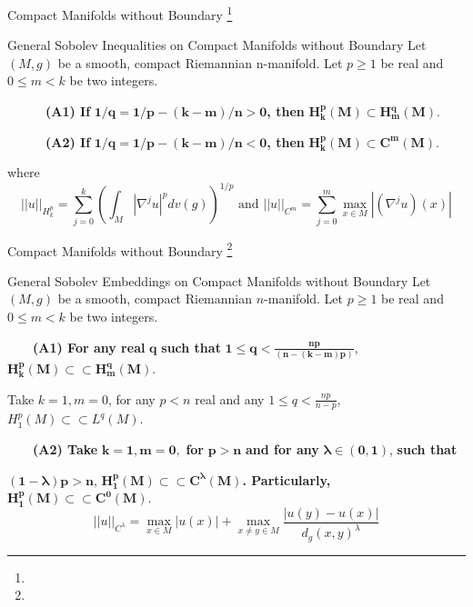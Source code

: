 \documentclass[xcolor=table,dvipsnames,svgnames,aspectratio=169,fontset=fandol]{ctexbeamer}
\begin{document}
\begin{frame}{Compact Manifolds without Boundary \footnote{} }
  \begin{alertblock}{General Sobolev Inequalities on Compact Manifolds without Boundary}
    Let $(M, g)$ be a smooth, compact Riemannian n-manifold.
    Let $p\geq 1$ be real and $0 \leq m<k$ be two integers.
    
    \vskip 5pt
    ~~~~~~\textbf{(A1) If} $\bm{1/q=1 / p-(k-m) / n > 0}$\textbf{, then} $\bm{H_k^p(M) \subset H_m^q(M)}$.
    
    \vskip 5pt
    ~~~~~~\textbf{(A2) If} $\bm{1/q=1 / p-(k-m) / n < 0}$\textbf{, then} $\bm{H_k^p(M) \subset C^m(M)}$.
    
    \vskip 5pt
    where
    $$
    ||u||_{H_k^p}=\sum_{j=0}^k\left(\int_M\left|\nabla^j u\right|^p d v(g)\right)^{1 / p}\,\,\text{and}\,\, ||u||_{C^m}=\sum_{j=0}^m \max _{x \in M}\left|\left(\nabla^j u\right)(x)\right|
    $$
  \end{alertblock}
\end{frame}

\begin{frame}{Compact Manifolds without Boundary \footnote{} }
  \begin{alertblock}{General Sobolev Embeddings on Compact Manifolds without Boundary}
    Let $(M, g)$ be a smooth, compact Riemannian $n$-manifold.
    Let $p\geq 1$ be real and $0 \leq m<k$ be two integers.
    
    \vskip 5pt
    ~~~~\textbf{(A1)  For any real} $\bm{q}$ \textbf{such that} $\bm{1 \leq q<\frac{n p}{(n-(k-m) p)}}$,\, $\bm{H_{k}^p(M)\subset \subset H_m^q(M)}$.
    
    \vskip 5pt
    Take $k=1,m=0$, for any $p<n$ real and any $1\leq q <\frac{np}{n-p}$, $H_1^p(M) \subset \subset L^q(M)$.
    
    \vskip 5pt
    ~~~~\textbf{(A2) Take} $\bm{k=1,m=0,}$ \textbf{for} $\bm{p>n}$ \textbf{and for any} $\bm{\lambda \in (0,1)}$, \textbf{such that} 
    
    \vskip 5pt
    $\bm{(1-\lambda) p>n}$, $\bm{H_1^p(M)\subset \subset C^\lambda(M)}$\textbf{. Particularly,} $\bm{H_1^p(M)\subset \subset C^0(M)}$.
    $$
    ||u||_{C^\lambda}=\max _{x \in M}|u(x)|+\max _{x \neq y \in M} \frac{|u(y)-u(x)|}{d_g(x, y)^\lambda}
    $$
  \end{alertblock}
\end{frame}
\end{document}
